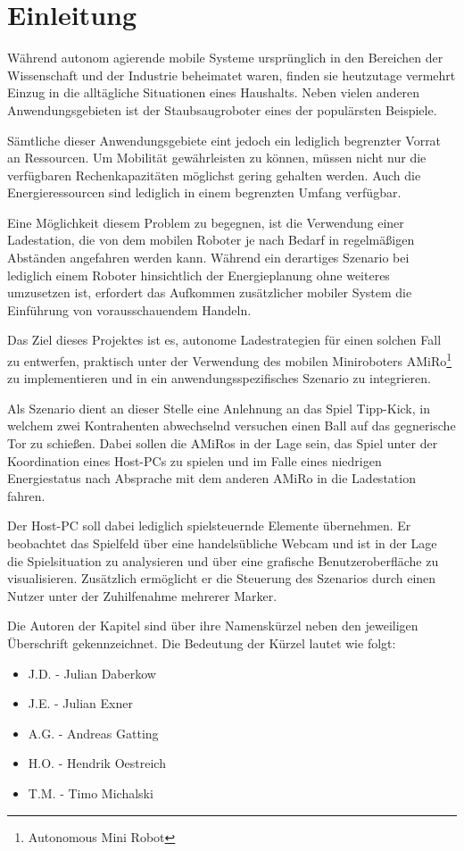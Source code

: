 \chapter[Einleitung]{Einleitung \hfill{}} \label{kap:einleitung} %

Während autonom agierende mobile Systeme ursprünglich in den Bereichen der Wissenschaft und der Industrie beheimatet waren, finden sie heutzutage vermehrt Einzug in die alltägliche Situationen eines Haushalts. Neben vielen anderen Anwendungsgebieten ist der Staubsaugroboter eines der populärsten Beispiele.

Sämtliche dieser Anwendungsgebiete eint jedoch ein lediglich begrenzter Vorrat an Ressourcen. Um Mobilität gewährleisten zu können, müssen nicht nur die verfügbaren Rechenkapazitäten möglichst gering gehalten werden. Auch die Energieressourcen sind lediglich in einem begrenzten Umfang verfügbar.

Eine Möglichkeit diesem Problem zu begegnen, ist die Verwendung einer Ladestation, die von dem mobilen Roboter je nach Bedarf in regelmäßigen Abständen angefahren werden kann. Während ein derartiges Szenario bei lediglich einem Roboter hinsichtlich der Energieplanung ohne weiteres umzusetzen ist, erfordert das Aufkommen zusätzlicher mobiler System die Einführung von vorausschauendem Handeln.

Das Ziel dieses Projektes ist es, autonome Ladestrategien für einen solchen Fall zu entwerfen, praktisch unter der Verwendung des mobilen Miniroboters AMiRo\footnote{Autonomous Mini Robot} zu implementieren und in ein anwendungsspezifisches Szenario zu integrieren.

Als Szenario dient an dieser Stelle eine Anlehnung an das Spiel Tipp-Kick, in welchem zwei Kontrahenten abwechselnd versuchen einen Ball auf das gegnerische Tor zu schießen. Dabei sollen die AMiRos in der Lage sein, das Spiel unter der Koordination eines Host-PCs zu spielen und im Falle eines niedrigen Energiestatus nach Absprache mit dem anderen AMiRo in die Ladestation fahren.

Der Host-PC soll dabei lediglich spielsteuernde Elemente übernehmen. Er beobachtet das Spielfeld über eine handelsübliche Webcam und ist in der Lage die Spielsituation zu analysieren und über eine grafische Benutzeroberfläche zu visualisieren. Zusätzlich ermöglicht er die Steuerung des Szenarios durch einen Nutzer unter der Zuhilfenahme mehrerer Marker.

Die Autoren der Kapitel sind über ihre Namenskürzel neben den jeweiligen Überschrift gekennzeichnet. Die Bedeutung der Kürzel lautet wie folgt:

\begin{itemize}
	\item{J.D. - Julian Daberkow}
	\item{J.E. - Julian Exner}
	\item{A.G. - Andreas Gatting}
	\item{H.O. - Hendrik Oestreich}
	\item{T.M. - Timo Michalski}
\end{itemize}